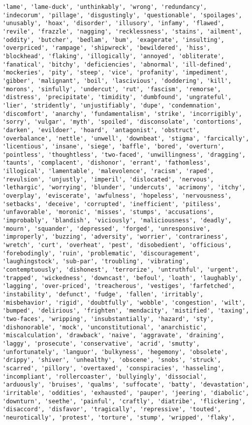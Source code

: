 \documentclass[11pt]{article}
\begin{document}
\begin{Verbatim}[commandchars=\\\{\}]
'lame', 'lame-duck', 'unthinkably', 'wrong', 'redundancy', 'indecorum', 'pillage', 'disgustingly', 'questionable', 'spoilages', 'unusably', 'hoax', 'disorder', 'illusory', 'infamy', 'flawed', 'revile', 'frazzle', 'nagging', 'recklessness', 'stains', 'ailment', 'oddity', 'butcher', 'bedlam', 'bum', 'exagerate', 'insulting', 'overpriced', 'rampage', 'shipwreck', 'bewildered', 'hiss', 'blockhead', 'flaking', 'illogically', 'annoyed', 'obliterate', 'fanatical', 'bitchy', 'deficiencies', 'abnormal', 'ill-defined', 'mockeries', 'pity', 'steep', 'vice', 'profanity', 'impediment', 'gibber', 'malignant', 'boil', 'lascivious', 'doddering', 'kill', 'morons', 'sinfully', 'undercut', 'rut', 'fascism', 'remorse', 'distress', 'precipitate', 'timidity', 'dumbfound', 'ungrateful', 'lier', 'stridently', 'unjustifiably', 'dupe', 'condemnation', 'discomfort', 'anarchy', 'fundamentalism', 'strike', 'incorrigibly', 'sorry', 'vulgar', 'myth', 'spoiled', 'disconsolate', 'contortions', 'darken', 'evildoer', 'hoard', 'antagonist', 'obstruct', 'overbalance', 'nettle', 'unwell', 'downbeat', 'stigma', 'farcically', 'licentious', 'insane', 'siege', 'baffle', 'bored', 'overturn', 'pointless', 'thoughtless', 'two-faced', 'unwillingness', 'dragging', 'taunts', 'complacent', 'dishonor', 'errant', 'fathomless', 'illogical', 'lamentable', 'malevolence', 'racism', 'raped', 'revulsion', 'unjustly', 'imperil', 'dislocated', 'nervous', 'lethargic', 'worrying', 'blunder', 'undercuts', 'acrimony', 'itchy', 'overplay', 'eviscerate', 'awfulness', 'hopeless', 'nervousness', 'setbacks', 'deceive', 'corrupted', 'inefficient', 'pitiless', 'unfavorable', 'moronic', 'misses', 'stumps', 'accusations', 'improbably', 'blandish', 'viciously', 'maliciousness', 'deadly', 'mourn', 'squander', 'depressed', 'forged', 'unresponsive', 'improperly', 'buzzing', 'adversity', 'worrier', 'contrariness', 'wretch', 'curt', 'overheat', 'pest', 'disobedient', 'officious', 'forebodingly', 'ruin', 'problematic', 'discouragement', 'laughingstock', 'sub-par', 'troubling', 'vibrating', 'contemptuously', 'dishonest', 'terrorize', 'untruthful', 'urgent', 'trapped', 'wickedness', 'downcast', 'befoul', 'loath', 'laughably', 'lagging', 'over-priced', 'treacherous', 'vestiges', 'farfetched', 'instability', 'defunct', 'fudge', 'fallen', 'irritably', 'misbehavior', 'rigid', 'doubtfully', 'wobble', 'congestion', 'wilt', 'bumped', 'delirious', 'frighten', 'mendacity', 'mistified', 'taxing', 'two-faces', 'wripping', 'insubstantially', 'hazard', 'sty', 'dishonorable', 'mock', 'unconstitutional', 'anarchistic', 'miscalculation', 'drawback', 'naive', 'aggravate', 'draining', 'laggy', 'prosecute', 'conservative', 'acrid', 'smutty', 'unfortunately', 'languor', 'bulkyness', 'hegemony', 'obsolete', 'drippy', 'shiver', 'unhealthy', 'obscene', 'snobs', 'struck', 'scarred', 'pillory', 'overtaxed', 'conspiracies', 'hasseling', 'incompliant', 'rollercoaster', 'bullyingly', 'dissocial', 'arduously', 'bruises', 'qualms', 'suffocate', 'batty', 'devastation', 'irritable', 'oddities', 'exhausted', 'pauper', 'jeering', 'diabolic', 'downturn', 'seethe', 'painful', 'craftly', 'diatribe', 'flickering', 'disaccord', 'disfavor', 'tragically', 'repressive', 'touted', 'neurotically', 'protest', 'torture', 'stump', 'wripped', 'flaky', 
\end{Verbatim}
\end{document}
